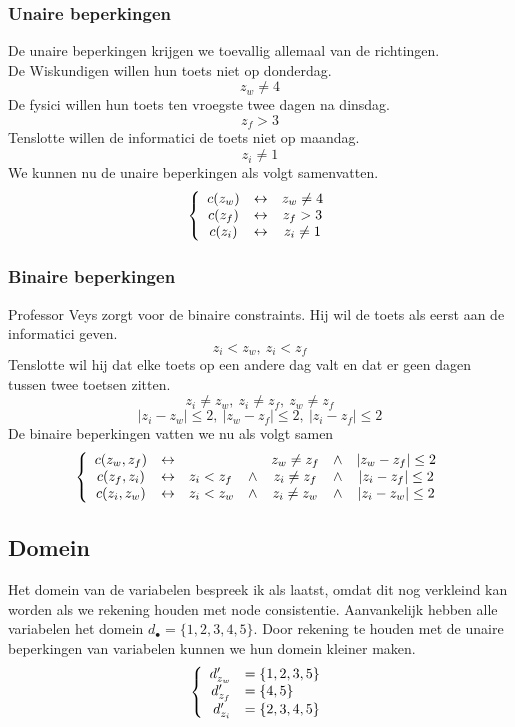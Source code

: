 \documentclass[alternative-exam.tex]{subfiles}
\begin{document}
\subsubsection{Unaire beperkingen}
De unaire beperkingen krijgen we toevallig allemaal van de richtingen.\\
De Wiskundigen willen hun toets niet op donderdag.
\[
z_w \neq 4
\]
De fysici willen hun toets ten vroegste twee dagen na dinsdag.
\[
z_f > 3
\]
Tenslotte willen de informatici de toets niet op maandag.
\[
z_i \neq 1
\]
We kunnen nu de unaire beperkingen als volgt samenvatten.
\[
\left\lbrace
\begin{array}{c c c}
c(z_w) & \leftrightarrow & z_w \neq 4\\
c(z_f) & \leftrightarrow & z_f > 3\\
c(z_i) & \leftrightarrow & z_i \neq 1\\
\end{array}
\right.
\]
\subsubsection{Binaire beperkingen}
Professor Veys zorgt voor de binaire constraints. Hij wil de toets als eerst aan de informatici geven.
\[
z_i < z_w,\ z_i < z_f
\]
Tenslotte wil hij dat elke toets op een andere dag valt en dat er geen dagen tussen twee toetsen zitten.
\[
z_i \neq z_w,\ z_i \neq z_f,\ z_w \neq z_f
\]
\[
|z_i - z_w| \le 2,\ |z_w - z_f| \le 2,\ |z_i - z_f| \le 2
\]
De binaire beperkingen vatten we nu als volgt samen
\[
\left\lbrace
\begin{array}{c l l c c c c}
c(z_w, z_f) & \leftrightarrow && & z_w \neq z_f &\wedge& |z_w - z_f| \le 2\\
c(z_f, z_i) & \leftrightarrow & z_i < z_f &\wedge& z_i \neq z_f &\wedge& |z_i - z_f| \le 2\\
c(z_i, z_w) & \leftrightarrow & z_i < z_w &\wedge& z_i \neq z_w &\wedge& |z_i - z_w| \le 2\\
\end{array}
\right.
\]

\subsection{Domein}
Het domein van de variabelen bespreek ik als laatst, omdat dit nog verkleind kan worden als we rekening houden met node consistentie.
Aanvankelijk hebben alle variabelen het domein $d_\bullet = \{1,2,3,4,5\}$. Door rekening te houden met de unaire beperkingen van variabelen kunnen we hun domein kleiner maken.
\[
\left\lbrace
\begin{array}{r l}
d_{z_w}' &= \{1,2,3,5\}\\
d_{z_f}' &= \{4,5\}\\
d_{z_i}' &= \{2,3,4,5\}\\
\end{array}
\right.
\]
\end{document}
